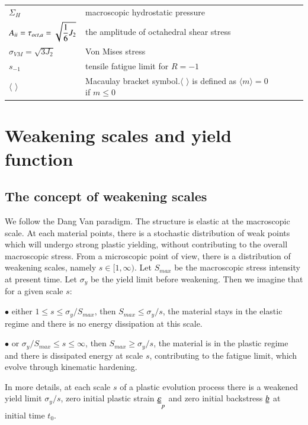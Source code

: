 \documentclass[3p,times,number,review]{elsarticle}
\begin{document}
\begin{flushleft}
\begin{table}[h]
\begin{tabular}{lllll}
			$\Sigma_H$& macroscopic hydrostatic pressure &  &  &  \\
			$A_{\uppercase\expandafter{\romannumeral2}}=\tau_{oct,a}=\sqrt{\dfrac{1}{6}J_{2}}$& the amplitude of octahedral shear stress &  &  &  \\
			$\sigma_{VM}=\sqrt{3J_{2}}$& Von Mises stress &  &  &  \\
			$s_{-1}$& tensile fatigue limit for $R=-1$  &  &  &  \\
			$\langle$ $\rangle$& Macaulay bracket symbol.$\langle$ $\rangle$ is defined as $\langle m\rangle=0$ if $m\leqslant0$
	\end{tabular}
	\end{table}
\end{flushleft}

\clearpage

\section{Weakening scales and yield function}
\subsection{The concept of weakening scales} 

We follow the Dang Van paradigm. The structure is elastic at the macroscopic scale. At each material points, there is a stochastic distribution of weak points which will undergo strong plastic yielding, without contributing to the overall macroscopic stress. From a microscopic point of view, there is a distribution of weakening scales, namely $s\in[1,\infty)$. Let $S_{max}$ be the macroscopic stress intensity at present time. Let $\sigma_y$ be the yield limit before weakening. Then we imagine that for a given scale $s$:

\vspace{6pt}
\noindent
$\bullet$ either $1\leqslant s\leqslant \sigma_y/S_{max}$, then $S_{max}\leqslant \sigma_y/s$, the material stays in the elastic regime and there is no energy dissipation at this scale.

\vspace{6pt}
\noindent
$\bullet$ or $\sigma_y/S_{max}\leqslant s\leqslant \infty$, then $S_{max}\geqslant \sigma_y/s$, the material is in the plastic regime and there is dissipated energy at scale $s$, contributing to the fatigue limit, which evolve through kinematic hardening.

In more details, at each scale $s$ of a plastic evolution process there is a weakened yield limit $\sigma_y/s$, zero initial plastic strain $\uuline{\varepsilon}_p$ and zero initial backstress $\uuline{b}$ at initial time $t_0$.
\end{document}

